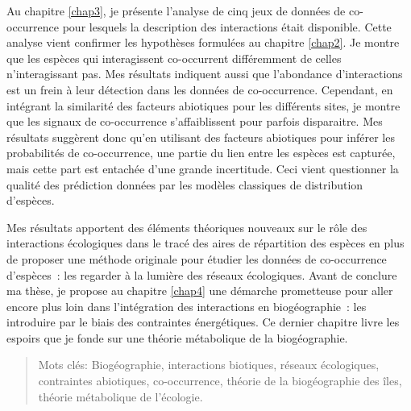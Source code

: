 Au chapitre \ref{chap3}, je présente l'analyse de cinq jeux de données
de co-occurrence pour lesquels la description des interactions était
disponible. Cette analyse vient confirmer les hypothèses formulées au
chapitre \ref{chap2}. Je montre que les espèces qui interagissent
co-occurrent différemment de celles n'interagissant pas. Mes résultats
indiquent aussi que l'abondance d'interactions est un frein à leur
détection dans les données de co-occurrence. Cependant, en intégrant la
similarité des facteurs abiotiques pour les différents sites, je montre
que les signaux de co-occurrence s'affaiblissent pour parfois
disparaitre. Mes résultats suggèrent donc qu'en utilisant des facteurs
abiotiques pour inférer les probabilités de co-occurrence, une partie du
lien entre les espèces est capturée, mais cette part est entachée d'une
grande incertitude. Ceci vient questionner la qualité des prédiction
données par les modèles classiques de distribution d'espèces.

Mes résultats apportent des éléments théoriques nouveaux sur le rôle des
interactions écologiques dans le tracé des aires de répartition des
espèces en plus de proposer une méthode originale pour étudier les
données de co-occurrence d'espèces~: les regarder à la lumière des
réseaux écologiques. Avant de conclure ma thèse, je propose au chapitre
\ref{chap4} une démarche prometteuse pour aller encore plus loin dans
l'intégration des interactions en biogéographie~: les introduire par le
biais des contraintes énergétiques. Ce dernier chapitre livre les
espoirs que je fonde sur une théorie métabolique de la biogéographie.

\begin{quote}
Mots clés: Biogéographie, interactions biotiques, réseaux écologiques,
contraintes abiotiques, co-occurrence, théorie de la biogéographie des
îles, théorie métabolique de l'écologie.
\end{quote}
